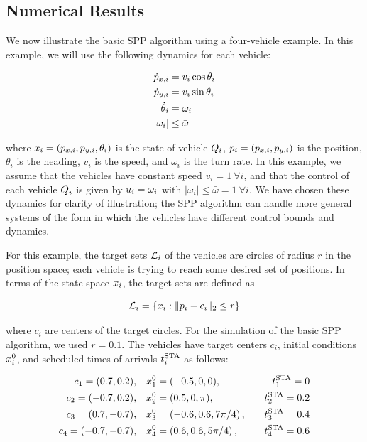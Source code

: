 \subsection{Numerical Results \label{sec:basic_results}}
We now illustrate the basic SPP algorithm using a four-vehicle example. In this example, we will use the following dynamics for each vehicle:

\begin{equation} \label{eqn:NumSimpleDyn}
\begin{aligned}
\dot{\pos}_{x,i} &= v_i \cos\theta_i \\
\dot{\pos}_{y,i} &= v_i \sin\theta_i \\
\dot \theta_i &= \omega_i \\
|\omega_i| &\le \bar\omega
\end{aligned}
\end{equation}

\noindent where $x_i = (p_{x,i}, p_{y,i}, \theta_i)$ is the state of vehicle $Q_i$, $p_i = (p_{x,i}, p_{y,i})$ is the position, $\theta_i$ is the heading, $v_i$ is the speed, and $\omega_i$ is the turn rate. In this example, we assume that the vehicles have constant speed $v_i = 1 ~ \forall i$, and that the control of each vehicle $Q_i$ is given by $u_i = \omega_i$ with $|\omega_i| \le \bar\omega = 1 ~ \forall i$. We have chosen these dynamics for clarity of illustration; the SPP algorithm can handle more general systems of the form in which the vehicles have different control bounds and dynamics. 

For this example, the target sets $\mathcal{L}_i$ of the vehicles are circles of radius $r$ in the position space; each vehicle is trying to reach some desired set of positions. In terms of the state space $x_i$, the target sets are defined as

\begin{equation}
\label{eq:target_sim}
\targetset_i = \{\state_i: \|\pos_i - c_i\|_2 \le r\}
\end{equation}

\noindent where $c_i$ are centers of the target circles. For the simulation of the basic SPP algorithm, we used $r = 0.1$. The vehicles have target centers $c_i$, initial conditions $x_i^0$, and scheduled times of arrivals $t^\text{STA}_i$ as follows:

\begin{equation} \label{eqn:NumIC}
\begin{aligned}
c_1 = (0.7, 0.2), \quad& \state_1^0 = (-0.5, 0, 0), \quad & \sta_1 = 0 \\
c_2 = (-0.7, 0.2), \quad& \state_2^0 = (0.5, 0, \pi), \quad & \sta_2 = 0.2 \\
c_3 = (0.7, -0.7), \quad& \state_3^0 = \left(-0.6, 0.6, 7\pi/4\right), \quad & \sta_3 = 0.4\\
c_4 = (-0.7, -0.7), \quad & \state_4^0 = \left(0.6, 0.6, 5\pi/4\right), \quad & \sta_4 = 0.6
\end{aligned}
\end{equation}

